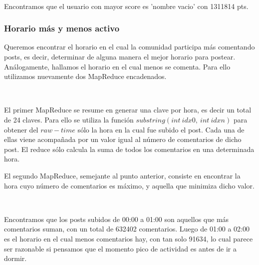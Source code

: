 ~

Encontramos que el usuario con mayor score es 'nombre vacio' con 1311814 pts.

\subsubsection{Horario más y menos activo}

Queremos encontrar el horario en el cual la comunidad participa más comentando posts, es decir, determinar de alguna manera el mejor horario para postear. Análogamente, hallamos el horario en el cual menos se comenta. Para ello utilizamos nuevamente dos MapReduce encadenados.

~

El primer MapReduce se resume en generar una clave por hora, es decir un total de 24 claves. Para ello se utiliza la función $substring(int \ idx0, \ int \ idxn)$ para obtener del $raw-time$ sólo la hora en la cual fue subido el post. Cada una de ellas viene acompa\~nada por un valor igual al número de comentarios de dicho post. El reduce sólo calcula la suma de todos los comentarios en una determinada hora.

El segundo MapReduce, semejante al punto anterior, consiste en encontrar la hora cuyo número de comentarios es máximo, y aquella que minimiza dicho valor.

~

Encontramos que los posts subidos de 00:00 a 01:00 son aquellos que más comentarios suman, con un total de 632402 comentarios. Luego de 01:00 a 02:00 es el horario en el cual menos comentarios hay, con tan solo 91634, lo cual parece ser razonable si pensamos que el momento pico de actividad es antes de ir a dormir.
